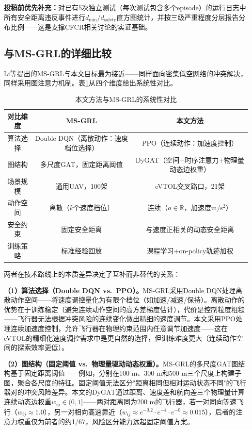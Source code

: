 \documentclass[12pt,a4paper,UTF8]{ctexart}
\begin{document}
\textbf{投稿前优先补充：}对已有5次独立测试（每次测试包含多个episode）的运行日志中所有安全距离违反事件进行$d_{\min}/d_{\text{safety}}$直方图统计，并按三级严重程度分层报告分布比例——这是支撑CFCR相关讨论的实证基础。

\subsection{与MS-GRL的详细比较}

Li等提出的MS-GRL\cite{ref24}与本文目标最为接近——同样面向密集低空网络的冲突解决，同样采用图注意力机制。表\ref{tab:ms_grl_comparison}从四个维度给出系统性对比。

\begin{table}[H]
    \centering
    \caption{本文方法与MS-GRL的系统性对比}
    \label{tab:ms_grl_comparison}
    \begin{tabular}{|c|c|c|}
        \hline
        \textbf{对比维度} & \textbf{MS-GRL \cite{ref24}} & \textbf{本文方法} \\
        \hline
        算法选择 & Double DQN（离散动作：速度档位选择） & PPO（连续动作：加速度控制） \\
        \hline
        图结构 & 多尺度GAT，固定距离阈值 & DyGAT（空间$+$时序注意力$+$物理量动态边权重） \\
        \hline
        场景规模 & 通用UAV，100架 & eVTOL交叉路口，21架 \\
        \hline
        动作空间 & 离散（$k$个速度档位） & 连续（$a \in \mathbb{R}$，加速度m/s$^2$） \\
        \hline
        安全约束 & 固定安全距离 & 与速度正相关的动态安全距离 \\
        \hline
        训练策略 & 标准经验回放 & 课程学习$+$on-policy轨迹加权 \\
        \hline
    \end{tabular}
\end{table}

两者在技术路线上的本质差异决定了互补而非替代的关系：

\textbf{（1）算法选择（Double DQN vs.\ PPO）。}MS-GRL采用Double DQN处理离散动作空间——将速度调控量化为有限个档位（如加速/减速/保持）。离散动作的优势在于训练稳定（避免连续动作空间的高方差梯度估计），代价是控制粒度粗糙——飞行器无法根据冲突风险的连续变化做出精细的速度调节。本文采用PPO处理连续加速度控制，允许飞行器在物理约束范围内任意调节加速度——这在eVTOL的精细化速度调控需求中是更自然的选择，但训练难度更大（连续动作空间的探索效率更低）。

\textbf{（2）图结构（固定阈值 vs.\ 物理量驱动动态权重）。}MS-GRL的多尺度GAT图结构基于固定距离阈值——例如，分别在100 m、300 m和500 m三个尺度上构建子图，聚合各尺度的特征。固定阈值无法区分"距离相同但相对运动状态不同"的飞行器对的冲突风险差异。本文的DyGAT通过距离、速度差和航向差三个物理量计算连续动态边权重$w_{ij} \in (0, 1]$——两对距离同为200 m的飞行器，若一对同向等速飞行（$w_{ij} \approx 1.0$），另一对相向高速靠近（$w_{ij} \approx e^{-0.2} \cdot e^{-4} \cdot e^{-0} \approx 0.015$），后者的注意力权重仅为前者的约1/67，风险区分能力远超固定阈值方案。
\end{document}

